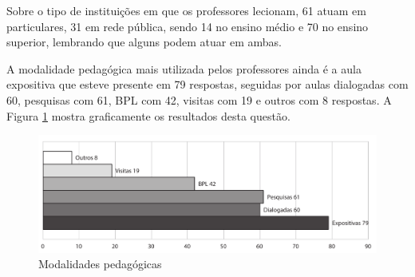 
Sobre o tipo de instituições em que os professores lecionam, 61 atuam em particulares, 31 em rede pública, sendo 14 no ensino médio e 70 no ensino superior, lembrando que alguns podem atuar em ambas. 

 



A modalidade pedagógica mais utilizada pelos professores ainda é a aula expositiva que esteve presente em 79 respostas, seguidas por aulas dialogadas com 60, pesquisas com 61, BPL com 42, visitas com 19 e outros com 8 respostas. A Figura \ref{fig:grafico_modalidade} mostra graficamente os resultados desta questão. 


 
\begin{figure}[!h]
\centering
\includegraphics[width=1.0\textwidth]{pdfs/professores/img-grafico-modalidade.pdf} 
\caption{Modalidades pedagógicas}
\label{fig:grafico_modalidade} 
\end{figure}


